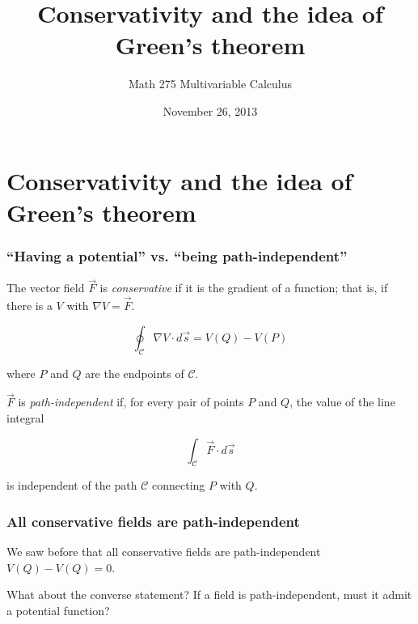 \documentclass[11pt,ignorenonframetext,aspectratio=169,xcolor={svgnames}]{beamer}
\title{Conservativity and the idea of Green's theorem}
\author{Math 275 Multivariable Calculus}
\date{November 26, 2013}
\begin{document}
\frame{\titlepage}

\section{Conservativity and the idea of Green's theorem}

\begin{frame}\frametitle{``Having a potential'' vs. ``being
path-independent''}

\begin{minipage}[t]{0.45\linewidth}
\vspace{0pt}
The vector field $\vec{F}$ is \emph{conservative} if it is the gradient
of a function; that is, if there is a $V$ with $\nabla V = \vec{F}$.

\begin{equation*}
    \oint_{\mathcal{C}} \nabla V \cdot d\vec{s} = V(Q) - V(P)
\end{equation*}

where $P$ and $Q$ are the endpoints of $\mathcal{C}$.
\end{minipage}
\hspace{1cm}
\begin{minipage}[t]{0.45\linewidth}
\vspace{0pt}
$\vec{F}$ is \emph{path-independent} if, for every pair of points $P$
and $Q$, the value of the line integral

\begin{equation*}
    \int_{\mathcal{C}} \vec{F} \cdot d\vec{s}
\end{equation*}

is independent of the path $\mathcal{C}$ connecting $P$ with $Q$.
\end{minipage}

\end{frame}

\begin{frame}\frametitle{All conservative fields are path-independent}

We saw before that all conservative fields are path-independent
$V(Q) - V(Q) = 0$.

What about the converse statement? If a field is path-independent, must
it admit a potential function?

\end{frame}
\end{document}
